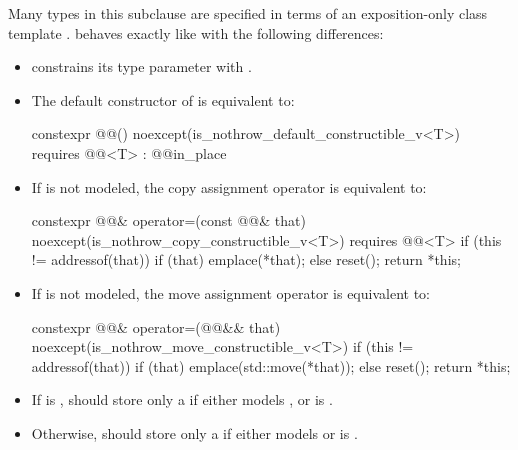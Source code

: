 \pnum
Many types in this subclause are specified in terms of
an exposition-only class template .
 behaves exactly like 
with the following differences:
\begin{itemize}
\item {} constrains
its type parameter  with
.

\item The default
constructor of  is equivalent to:
\begin{codeblock}
constexpr @@() noexcept(is_nothrow_default_constructible_v<T>)
    requires @@<T>
  : @@{in_place} {}
\end{codeblock}

\item If  is not
modeled, the copy assignment operator is equivalent to:
\begin{codeblock}
constexpr @@& operator=(const @@& that)
  noexcept(is_nothrow_copy_constructible_v<T>)
  requires @@<T> {
  if (this != addressof(that)) {
    if (that) emplace(*that);
    else reset();
  }
  return *this;
}
\end{codeblock}

\item If  is not modeled,
the move assignment operator is equivalent to:
\begin{codeblock}
constexpr @@& operator=(@@&& that)
  noexcept(is_nothrow_move_constructible_v<T>) {
  if (this != addressof(that)) {
    if (that) emplace(std::move(*that));
    else reset();
  }
  return *this;
}
\end{codeblock}
\end{itemize}

\pnum
\recommended
\begin{itemize}
\item
If  is ,
 should store only a 
if either  models , or
is .
\item
Otherwise,  should store only a 
if either  models  or
 is .
\end{itemize}

